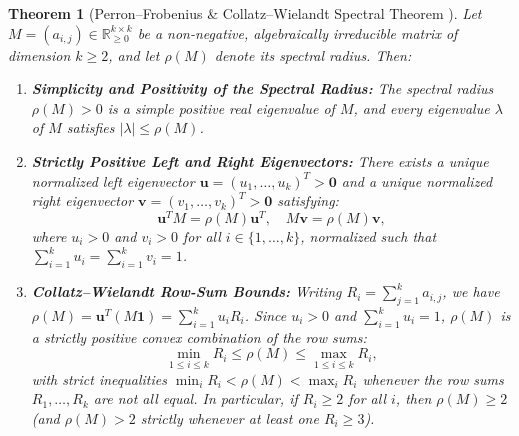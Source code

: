 \documentclass[11pt,a4paper]{article}
\newtheorem{theorem}{Theorem}[section]
\theoremstyle{definition}
\begin{document}
\begin{theorem}[Perron--Frobenius \& Collatz--Wielandt Spectral Theorem \cite{perron1907, frobenius1912, collatz1942, wielandt1950}]
\label{thm:perron_frobenius}
Let $M = (a_{i,j}) \in \mathbb{R}_{\ge 0}^{k \times k}$ be a non-negative, algebraically irreducible matrix of dimension $k \ge 2$, and let $\rho(M)$ denote its spectral radius. Then:
\begin{enumerate}
    \item \textbf{Simplicity and Positivity of the Spectral Radius:} The spectral radius $\rho(M) > 0$ is a simple positive real eigenvalue of $M$, and every eigenvalue $\lambda$ of $M$ satisfies $|\lambda| \le \rho(M)$.
    \item \textbf{Strictly Positive Left and Right Eigenvectors:} There exists a unique normalized left eigenvector $\mathbf{u} = (u_1, \dots, u_k)^T > \mathbf{0}$ and a unique normalized right eigenvector $\mathbf{v} = (v_1, \dots, v_k)^T > \mathbf{0}$ satisfying:
    \[
    \mathbf{u}^T M = \rho(M) \mathbf{u}^T, \quad M \mathbf{v} = \rho(M) \mathbf{v},
    \]
    where $u_i > 0$ and $v_i > 0$ for all $i \in \{1, \dots, k\}$, normalized such that $\sum_{i=1}^k u_i = \sum_{i=1}^k v_i = 1$.
    \item \textbf{Collatz--Wielandt Row-Sum Bounds:} Writing $R_i = \sum_{j=1}^k a_{i,j}$, we have $\rho(M) = \mathbf{u}^T (M \mathbf{1}) = \sum_{i=1}^k u_i R_i$. Since $u_i > 0$ and $\sum_{i=1}^k u_i = 1$, $\rho(M)$ is a strictly positive convex combination of the row sums:
    \begin{equation}
    \label{eq:row_sum_bounds}
    \min_{1 \le i \le k} R_i \le \rho(M) \le \max_{1 \le i \le k} R_i,
    \end{equation}
    with strict inequalities $\min_i R_i < \rho(M) < \max_i R_i$ whenever the row sums $R_1, \dots, R_k$ are not all equal. In particular, if $R_i \ge 2$ for all $i$, then $\rho(M) \ge 2$ (and $\rho(M) > 2$ strictly whenever at least one $R_i \ge 3$).
\end{enumerate}
\end{theorem}
\end{document}
